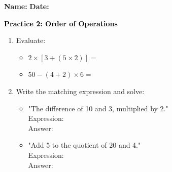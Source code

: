 \documentclass[12pt, letterpaper, fleqn]{article}
\newcommand{\blank}{\underline{\hspace{2.2cm}}}
\newcommand{\blanklong}{\underline{\hspace{6.5cm}}}
\begin{document}
\textbf{Name:} \underline{\hspace{5cm}}
\hfill
\textbf{Date:} \underline{\hspace{3cm}}\\

\begin{tcolorbox}[colback=customteal!20]
    \large\textcolor{black}{\textbf{Practice 2: Order of Operations}}
\end{tcolorbox}

\vspace{5mm}
\begin{enumerate}[itemsep=3cm, leftmargin=0.6cm]
\item Evaluate:
  \begin{itemize}[itemsep=1cm]
    \item $2 \times [3 + (5 \times 2)] = $ \blank
    \item $50 - (4 + 2) \times 6 = $ \blank
  \end{itemize}

\item Write the matching expression and solve:
  \begin{itemize}[itemsep=1.5cm]
    \item "The difference of 10 and 3, multiplied by 2." \\ Expression: \blanklong \\ Answer: \blank
    \item "Add 5 to the quotient of 20 and 4." \\ Expression: \blanklong \\ Answer: \blank
  \end{itemize}
\end{enumerate}
\end{document}

